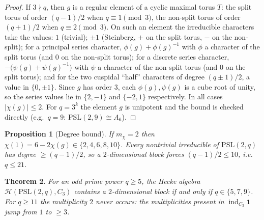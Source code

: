 \documentclass[11pt]{article}
\newtheorem{theorem}{Theorem}[section]
\newtheorem{proposition}[theorem]{Proposition}
\theoremstyle{remark}
\newcommand{\ind}{\operatorname{ind}}
\begin{document}
\begin{proof}
If $3\nmid q$, then $g$ is a regular element of a cyclic maximal torus $T$:
the split torus of order $(q-1)/2$ when $q\equiv1\pmod3$, the non-split
torus of order $(q+1)/2$ when $q\equiv2\pmod3$. On such an element the
irreducible characters take the values: $1$ (trivial); $\pm1$ (Steinberg,
$+$ on the split torus, $-$ on the non-split); for a principal series
character, $\phi(g)+\phi(g)^{-1}$ with $\phi$ a character of the split torus
(and $0$ on the non-split torus); for a discrete series character,
$-\bigl(\psi(g)+\psi(g)^{-1}\bigr)$ with $\psi$ a character of the non-split
torus (and $0$ on the split torus); and for the two cuspidal ``half''
characters of degree $(q\pm1)/2$, a value in $\{0,\pm1\}$. Since $g$ has
order $3$, each $\phi(g),\psi(g)$ is a cube root of unity, so the series
values lie in $\{2,-1\}$ and $\{-2,1\}$ respectively. In all cases
$|\chi(g)|\le 2$. For $q=3^k$ the element $g$ is unipotent and the bound is
checked directly (e.g.\ $q=9$: $\mathrm{PSL}(2,9)\cong A_6$).
\end{proof}

\begin{proposition}[Degree bound]\label{prop:degbound}
If $m_\chi=2$ then $\chi(1)=6-2\chi(g)\in\{2,4,6,8,10\}$. Every nontrivial
irreducible of $\mathrm{PSL}(2,q)$ has degree $\ge(q-1)/2$, so a
$2$-dimensional block forces $(q-1)/2\le10$, i.e.\ $q\le 21$.
\end{proposition}

\begin{theorem}\label{thm:2dim}
For an odd prime power $q\ge5$, the Hecke algebra
$\mathcal H(\mathrm{PSL}(2,q),C_3)$ contains a $2$-dimensional block if and
only if $q\in\{5,7,9\}$. For $q\ge11$ the multiplicity $2$ never occurs: the
multiplicities present in $\ind_{C_3}\mathbf1$ jump from $1$ to $\ge3$.
\end{theorem}
\end{document}
